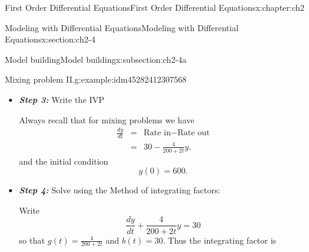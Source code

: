 \documentclass[oneside,10pt,]{book}
\newcommand{\alert}[1]{\textbf{\textit{#1}}}
\numberwithin{equation}{section}
\numberwithin{equation}{section}
\newcommand{\amp}{&}
\begin{document}
\begin{chapterptx}{First Order Differential Equations}{}{First Order Differential Equations}{}{}{x:chapter:ch2}
\begin{sectionptx}{Modeling with Differential Equations}{}{Modeling with Differential Equations}{}{}{x:section:ch2-4}
\begin{subsectionptx}{Model building}{}{Model building}{}{}{x:subsection:ch2-4a}
\begin{example}{Mixing problem II.}{g:example:idm45282412307568}
\begin{itemize}[label=\textbullet]
\begin{equation*}
\begin{array}{c}
\end{array}\right)\times\mbox{Rate}.
\end{equation*}
%
\par
We have%
\begin{align*}
\text{Rate in}\amp = \amp \underset{\mbox{-sugar water solution}}{\left(5\frac{\mbox{pounds}}{\mbox{gallon}}\right)\left(6\frac{\mbox{gallons}}{\mbox{min}}\right)}\\
\amp = \amp 30\frac{\mbox{pounds}}{\mbox{gallon}}.
\end{align*}
%
\par
To find the concentration of sugar coming out we have know the amount of water at time \(t\).%
\begin{align*}
\mbox{Water at time }t \amp = \amp 200\mbox{ gallons}+\left(6\frac{\mbox{gallons}}{\mbox{min}}-4\frac{\mbox{gallons}}{\mbox{min}}\right)t\\
\amp = \amp 200+2t,
\end{align*}
So%
\begin{align*}
\mbox{Rate out} \amp = \amp \left(\begin{array}{c}
\mbox{concentration}\\
\mbox{of stuff going out}
\end{array}\right)\times\mbox{Rate}\\
\amp = \amp \left(\frac{y(t)}{200+2t}\frac{\text{pounds}}{\text{gallon}}\right)\times4\frac{\mbox{gallons}}{\mbox{min}}.\\
\amp = \amp 4\frac{y(t)}{200+2t}\frac{\text{pound}}{\text{min}}.
\end{align*}
%
\item{}\alert{Step 3:} Write the IVP%
\par
Always recall that for mixing problems we have%
\begin{align*}
\frac{dy}{dt} \amp = \amp \mbox{Rate in}-\mbox{Rate out}\\
\amp = \amp 30-\frac{4}{200+2t}y.
\end{align*}
and the initial condition%
\begin{equation*}
y(0)=600.
\end{equation*}
%
\item{}\alert{Step 4:} Solve using the Method of integrating factors:%
\par
Write%
\begin{equation*}
\frac{dy}{dt}+\frac{4}{200+2t}y=30
\end{equation*}
so that \(g(t)=\frac{4}{200+2t}\) and \(b(t)=30\). Thus the integrating factor is%

\end{itemize}
\end{example}
\end{subsectionptx}
\end{sectionptx}
\end{chapterptx}
\end{document}
